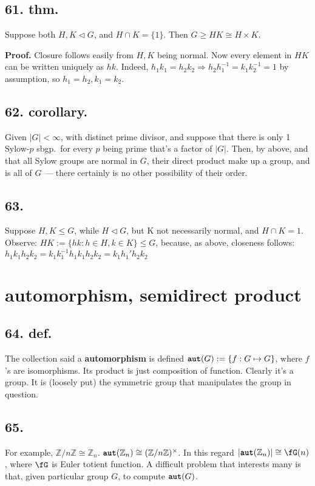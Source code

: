 \documentclass[12pt]{article}
\newcommand\oo\infty%
\newcommand\X\times%
\newcommand\Mp\mapsto%
\newcommand{\Ip}{\Rightarrow} %
\newcommand{\BF}[1]{ \mathbb{#1} }%
\newcommand{\Ss}[1]{\textsf{\textbf{#1}}}%
\newcommand{\Tw}[1]{\texttt{\textbf{#1}}}%
\begin{document}
\subsection*{61. thm.} Suppose both \(H, K \lhd G\), and \(H \cap K = \{1\}\). 
Then  \(G \geq HK \cong H \X K\). \par
\Ss{Proof.} Closure follows easily from \(H, K\) being normal. 
Now every element in \(HK\) can be written uniquely as \(hk\). 
Indeed, \(h_1 k_1 = h_2 k_2 \Ip h_2 h_1^{-1} = k_1 k_2^{-1} = 1\) by assumption, so \(h_1 = h_2, k_1 = k_2\). 

\subsection*{62. corollary.} Given \(|G| < \oo\), with distinct prime divisor, and suppose that there is only 1 Sylow-\(p\) sbgp.\ for every \(p\) being prime that's a factor of \(|G|\). 
Then, by above, and that all Sylow groups are normal in \(G\), their direct product make up a group, and is all of \(G\) --- there certainly is no other possibility of their order. 

\subsection*{63.} Suppose \(H,K \leq G\), while \(H \lhd G\), but K not necessarily normal, and \(H \cap K = 1\). 
Observe: \(HK := \{ hk: h\in H, k\in K \} \leq G\), 
because, as above, closeness follows: \(h_1 k_1 h_2 k_2 = k_1 k_1^{-1} h_1 k_1 h_2 k_2 = k_1 h_1' h_2 k_2\)

\section{automorphism, semidirect product}
\subsection*{64. def.} The collection said a \Ss{automorphism} is defined \(\Tw{aut}(G) := \{f: G \Mp G\}\), where \(f\)'s are isomorphisms. 
Its product is just composition of function. 
Clearly it's a group. 
It is (loosely put) the symmetric group that manipulates the group in question. 

\subsection*{65.} For example, \(\BF Z / n \BF Z \cong \BF Z_n\). 
\(\Tw{aut}(\BF Z_n) \cong (\BF Z / n \BF Z)^\X\).
In this regard \(|\Tw{aut}(\BF Z_n)| \cong \fG(n)\), where \(\fG\) is Euler totient function. 
A difficult problem that interests many is that, given particular group \(G\), to compute \(\Tw{aut}(G)\). \par
\end{document}
